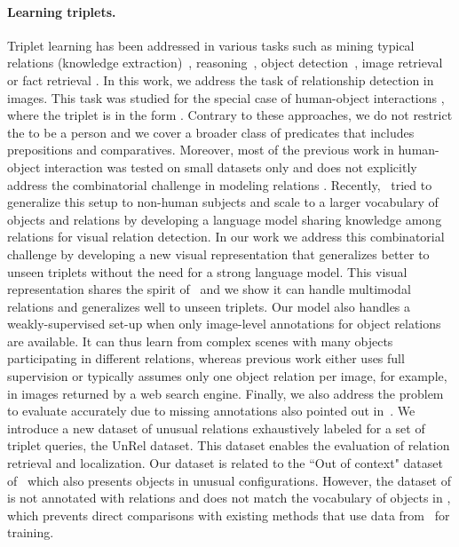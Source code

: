 \documentclass[10pt,twocolumn,letterpaper]{article}
\begin{document}
\paragraph{Learning triplets.} 
Triplet learning has been addressed in various tasks such as mining typical relations (knowledge extraction)~\cite{chen2013neil,sadeghi2015viske,yatskar2016stating,Zhu2014}, reasoning~\cite{jenatton2012,Movshovitz-attias,Socher2013b}, object detection~\cite{Gupta08,Sadeghi2011}, image retrieval~\cite{Johnson15a} or fact retrieval \cite{elhoseiny2015sherlock}. In this work, we address the task of relationship detection in images. This task was studied for the special case of human-object interactions \cite{Delaitre11,Desai2010,Gupta2009,Prest12,ramanathan15,Yao2010,Yao2010a,Yao11}, where the triplet is in the form . Contrary to these approaches, we do not restrict the  to be a person and we cover a broader class of predicates that includes prepositions and comparatives. Moreover, most of the previous work in human-object interaction was tested on small datasets only and does not explicitly address the combinatorial challenge in modeling relations \cite{Sadeghi2011}. Recently,~\cite{Lu16} tried to generalize this setup to non-human subjects and scale to a larger vocabulary of objects and relations by developing a language model sharing knowledge among relations for visual relation detection. In our work we address this combinatorial challenge by developing a new visual representation that generalizes better to unseen triplets without the need for a strong language model. This visual representation shares the spirit of~\cite{galleguillos2008object,Johnson15a,li2012automatic} and we show it can handle multimodal relations and generalizes well to unseen triplets. Our model also handles a weakly-supervised set-up when only image-level annotations for object relations are available. It can thus learn from complex scenes with many objects participating in different relations, whereas previous work either uses full supervision or typically assumes only one object relation per image, for example, in images returned by a web search engine. 
Finally, we also address the problem to evaluate accurately due to missing annotations also pointed out in~\cite{elhoseiny2015sherlock,Lu16}. We introduce a new dataset of unusual relations exhaustively labeled for a set of triplet queries, the UnRel dataset. This dataset enables the evaluation of relation retrieval and localization. 
Our dataset is related to the ``Out of context" dataset of~\cite{Choi2012} which also presents objects in unusual configurations. However, the dataset of \cite{Choi2012} is not annotated with relations and does not match the vocabulary of objects in \cite{Lu16}, which prevents direct comparisons with existing methods that use data from~\cite{Lu16} for training.
\end{document}
